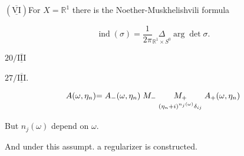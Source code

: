 $(\overline{\underline{\mathrm{VI}}})$\quad For $X=\mathbb R^1$ there is the Noether-Muskhelishvili formula



\begin{equation*}\operatorname{ind}(\sigma)=\frac{1}{2\pi}\underset{\mathbb R^1\times S^0}{\Delta}\arg\det\sigma.\end{equation*}





$20/\overline{\underline{\mathrm{III}}}$\quad{}






$27/\overline{\underline{\mathrm{III}}}$.



\begin{equation*}
\begin{array}{@{}r@{}c@{}c@{\;}c@{\;}c@{\;}l@{}}
A (\omega,\eta_n)&={}&A_-(\omega,\eta_n)&M_-&M_+&A_+(\omega,\eta_n)\\
&&&&\scriptstyle (\eta_n+i)^{n_j (\omega)}\delta_{ij}&
\end{array}
\end{equation*}






But $n_j (\omega)$ depend on $\omega$.



And under this assumpt. a regularizer is constructed.



